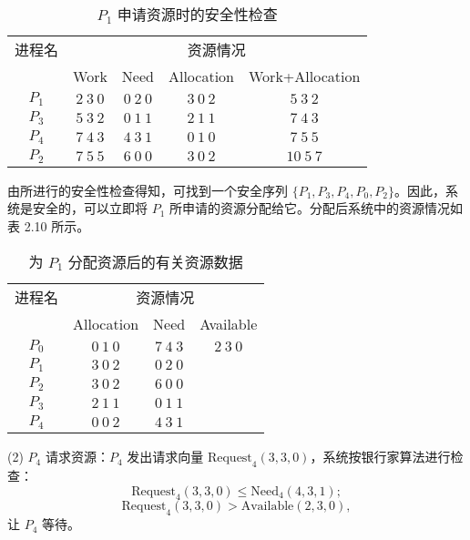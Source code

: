 \documentclass{ctexbook}
\begin{document}
		\begin{table}[h]
			\centering
			\caption{$P_1$ 申请资源时的安全性检查}
			\label{tab:p1_security_check}
			\begin{tabular}{|c|c|c|c|c|}
				\hline
				进程名 & \multicolumn{4}{c|}{资源情况} \\
				\cline{2-5}
				& Work & Need & Allocation & Work+Allocation \\
				\hline
				$P_1$ & $2 \ 3 \ 0$ & $0 \ 2 \ 0$ & $3 \ 0 \ 2$ & $5 \ 3 \ 2$ \\
				\hline
				$P_3$ & $5 \ 3 \ 2$ & $0 \ 1 \ 1$ & $2 \ 1 \ 1$ & $7 \ 4 \ 3$ \\
				\hline
				$P_4$ & $7 \ 4 \ 3$ & $4 \ 3 \ 1$ & $0 \ 1 \ 0$ & $7 \ 5 \ 5$ \\
				\hline
				$P_2$ & $7 \ 5 \ 5$ & $6 \ 0 \ 0$ & $3 \ 0 \ 2$ & $10 \ 5 \ 7$ \\
				\hline
			\end{tabular}
		\end{table}
		
		由所进行的安全性检查得知，可找到一个安全序列 $\{P_1, P_3, P_4, P_0, P_2\}$。因此，系统是安全的，可以立即将 $P_1$ 所申请的资源分配给它。分配后系统中的资源情况如表 2.10 所示。
		
		\begin{table}[h]
			\centering
			\caption{为 $P_1$ 分配资源后的有关资源数据}
			\label{tab:p1_allocation_after}
			\begin{tabular}{|c|c|c|c|}
				\hline
				进程名 & \multicolumn{3}{c|}{资源情况} \\
				\cline{2-4}
				& Allocation & Need & Available \\
				\hline
				$P_0$ & $0 \ 1 \ 0$ & $7 \ 4 \ 3$ & $2 \ 3 \ 0$ \\
				\hline
				$P_1$ & $3 \ 0 \ 2$ & $0 \ 2 \ 0$ & \\
				\hline
				$P_2$ & $3 \ 0 \ 2$ & $6 \ 0 \ 0$ & \\
				\hline
				$P_3$ & $2 \ 1 \ 1$ & $0 \ 1 \ 1$ & \\
				\hline
				$P_4$ & $0 \ 0 \ 2$ & $4 \ 3 \ 1$ & \\
				\hline
			\end{tabular}
		\end{table}
		
		(2) $P_4$ 请求资源：$P_4$ 发出请求向量 $\text{Request}_4(3, 3, 0)$，系统按银行家算法进行检查：
		\[ 
		\text{Request}_4(3, 3, 0) \leq \text{Need}_4(4, 3, 1);
		\]
		\[ 
		\text{Request}_4(3, 3, 0) > \text{Available}(2, 3, 0),
		\]
		让 $P_4$ 等待。
		
\end{document}
